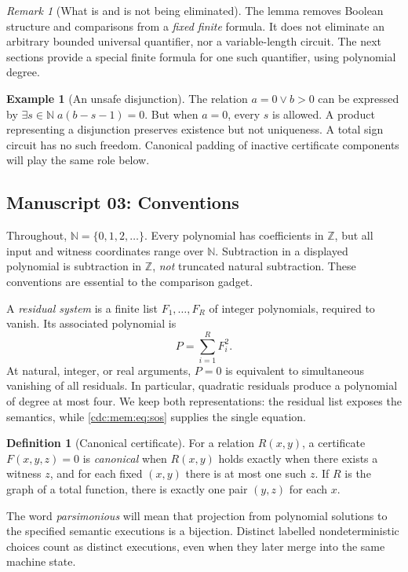 \documentclass[11pt,a4paper]{article}
\theoremstyle{definition}
\newtheorem{definition}[definition]{Definition}
\newtheorem{example}[example]{Example}
\theoremstyle{remark}
\newtheorem{remark}[remark]{Remark}
\newcommand{\N}{\mathbb N}
\newcommand{\Z}{\mathbb Z}
\begin{document}
\begin{remark}[What is and is not being eliminated]
The lemma removes Boolean structure and comparisons from a \emph{fixed
finite} formula. It does not eliminate an arbitrary bounded universal
quantifier, nor a variable-length circuit. The next sections provide a
special finite formula for one such quantifier, using polynomial degree.
\end{remark}

\begin{example}[An unsafe disjunction]
The relation $a=0\vee b>0$ can be expressed by
$\exists s\in\N\;a(b-s-1)=0$. But when $a=0$, every $s$ is allowed.
A product representing a disjunction preserves existence but not
uniqueness. A total sign circuit has no such freedom. Canonical padding of
inactive certificate components will play the same role below.
\end{example}


\subsection{Manuscript 03: Conventions}
Throughout, $\N=\{0,1,2,\ldots\}$. Every polynomial has coefficients in $\Z$, but
all input and witness coordinates range over $\N$. Subtraction in a displayed
polynomial is subtraction in $\Z$, \emph{not} truncated natural subtraction.
These conventions are essential to the comparison gadget.

A \emph{residual system} is a finite list $F_1,\ldots,F_R$ of integer
polynomials, required to vanish. Its associated polynomial is
\begin{equation}\label{cdc:mem:eq:sos}
 P=\sum_{i=1}^{R}F_i^2.
\end{equation}
At natural, integer, or real arguments, $P=0$ is equivalent to simultaneous
vanishing of all residuals. In particular, quadratic residuals produce a
polynomial of degree at most four. We keep both representations: the residual
list exposes the semantics, while \eqref{cdc:mem:eq:sos} supplies the single equation.

\begin{definition}[Canonical certificate]
For a relation $R(x,y)$, a certificate $F(x,y,z)=0$ is \emph{canonical} when
$R(x,y)$ holds exactly when there exists a witness $z$, and for each fixed
$(x,y)$ there is at most one such $z$. If $R$ is the graph of a total function,
there is exactly one pair $(y,z)$ for each $x$.
\end{definition}
The word \emph{parsimonious} will mean that projection from polynomial solutions
to the specified semantic executions is a bijection. Distinct labelled
nondeterministic choices count as distinct executions, even when they later
merge into the same machine state.
\end{document}
